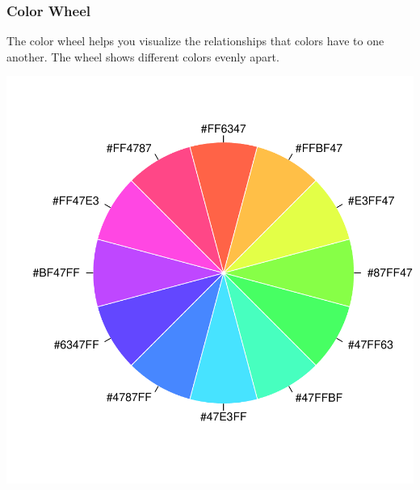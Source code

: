 \documentclass[12pt]{beamer}\usepackage[]{graphicx}\usepackage[]{color}
\newenvironment{knitrout}{}{} %
\begin{document}

\begin{frame}[fragile]
\frametitle{Color Wheel}

The color wheel helps you visualize the relationships that colors have to one another. The wheel shows different colors evenly apart.
\eb

\begin{knitrout}\scriptsize
{}\color{fgcolor}

{\centering \includegraphics[width=.4\linewidth,height=.4\linewidth]{figure/colorwheel-1} 

}



\end{knitrout}

\end{frame}

\end{document}
